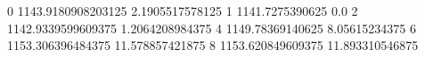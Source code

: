 0 1143.9180908203125 2.1905517578125
1 1141.7275390625 0.0
2 1142.9339599609375 1.2064208984375
4 1149.78369140625 8.05615234375
6 1153.306396484375 11.578857421875
8 1153.620849609375 11.893310546875
